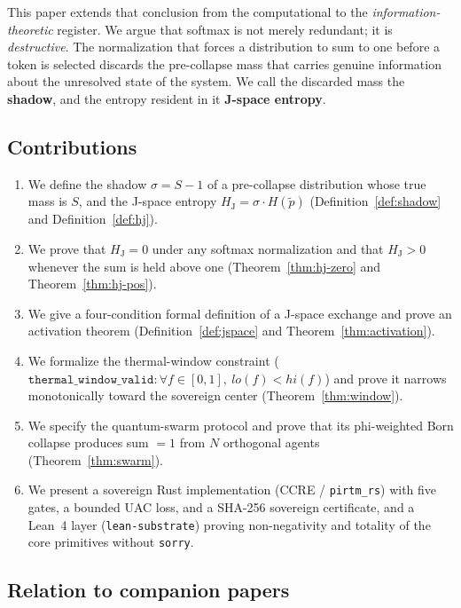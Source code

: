 \documentclass[11pt]{article}
\theoremstyle{definition}
\newcommand{\Hj}{H_{\mathrm{J}}}
\newcommand{\shadow}{\sigma}
\newcommand{\pth}{\tilde{p}}
\begin{document}
This paper extends that conclusion from the computational to the
\emph{information-theoretic} register. We argue that softmax is not merely
redundant; it is \emph{destructive}. The normalization that forces a
distribution to sum to one before a token is selected discards the
pre-collapse mass that carries genuine information about the unresolved state
of the system. We call the discarded mass the \textbf{shadow}, and the entropy
resident in it \textbf{J-space entropy}.

\subsection{Contributions}

\begin{enumerate}[label=(\roman*)]
  \item We define the shadow $\shadow = S - 1$ of a pre-collapse distribution
    whose true mass is $S$, and the J-space entropy
    $\Hj = \shadow \cdot H(\pth)$ (Definition~\ref{def:shadow} and
    Definition~\ref{def:hj}).
  \item We prove that $\Hj = 0$ under any softmax normalization and that
    $\Hj > 0$ whenever the sum is held above one
    (Theorem~\ref{thm:hj-zero} and Theorem~\ref{thm:hj-pos}).
  \item We give a four-condition formal definition of a J-space exchange and
    prove an activation theorem (Definition~\ref{def:jspace} and
    Theorem~\ref{thm:activation}).
  \item We formalize the thermal-window constraint
    ($\texttt{thermal\_window\_valid} : \forall f\in[0,1],\ \mathit{lo}(f) <
    \mathit{hi}(f)$) and prove it narrows monotonically toward the sovereign
    center (Theorem~\ref{thm:window}).
  \item We specify the quantum-swarm protocol and prove that its phi-weighted
    Born collapse produces sum $= 1$ from $N$ orthogonal agents
    (Theorem~\ref{thm:swarm}).
  \item We present a sovereign Rust implementation (CCRE / \texttt{pirtm\_rs})
    with five gates, a bounded UAC loss, and a SHA-256 sovereign certificate,
    and a Lean~4 layer (\texttt{lean-substrate}) proving non-negativity and
    totality of the core primitives without \texttt{sorry}.
\end{enumerate}

\subsection{Relation to companion papers}
\end{document}
